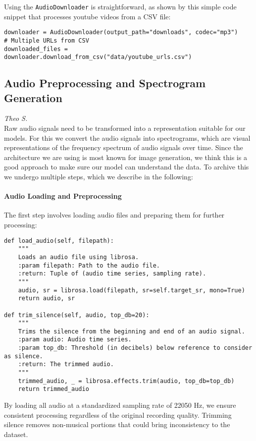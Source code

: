 Using the \texttt{AudioDownloader} is straightforward, as shown by this simple code snippet that processes youtube videos from a CSV file:

\begin{lstlisting}[caption=Example usage of AudioDownloader with CSV]
downloader = AudioDownloader(output_path="downloads", codec="mp3")
# Multiple URLs from CSV
downloaded_files = downloader.download_from_csv("data/youtube_urls.csv")
\end{lstlisting}

\subsection{Audio Preprocessing and Spectrogram Generation}
\textit{Theo S.}\\
Raw audio signals need to be transformed into a representation suitable for our models.
For this we convert the audio signals into spectrograms, which are visual representations of the frequency spectrum of audio signals over time.
Since the architecture we are using is most known for image generation, we think this is a good approach to make sure our model can understand the data.
To archive this we undergo multiple steps, which we describe in the following:

\paragraph{Audio Loading and Preprocessing}
The first step involves loading audio files and preparing them for further processing:

\begin{lstlisting}[caption=Audio loading and silence trimming]
def load_audio(self, filepath):
    """
    Loads an audio file using librosa.
    :param filepath: Path to the audio file.
    :return: Tuple of (audio time series, sampling rate).
    """
    audio, sr = librosa.load(filepath, sr=self.target_sr, mono=True)
    return audio, sr

def trim_silence(self, audio, top_db=20):
    """
    Trims the silence from the beginning and end of an audio signal.
    :param audio: Audio time series.
    :param top_db: Threshold (in decibels) below reference to consider as silence.
    :return: The trimmed audio.
    """
    trimmed_audio, _ = librosa.effects.trim(audio, top_db=top_db)
    return trimmed_audio
\end{lstlisting}

By loading all audio at a standardized sampling rate of 22050 Hz, we ensure consistent processing regardless of the original recording quality. 
Trimming silence removes non-musical portions that could bring inconsistency to the dataset.

